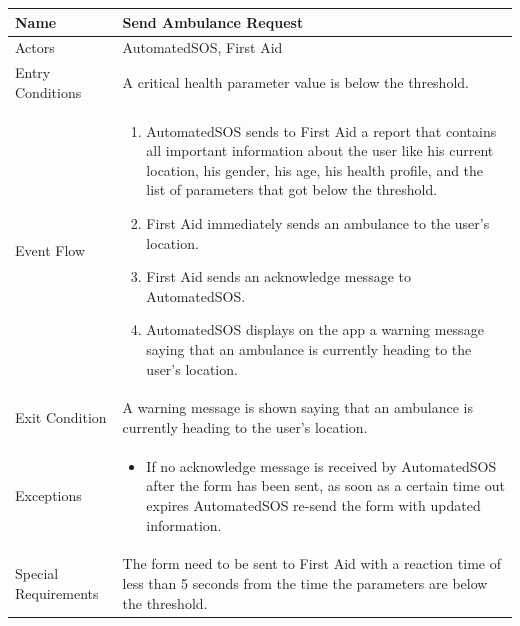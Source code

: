 \begin{enumerate}
\FloatBarrier
\begin{table}[h]
\begin{tabular}{|l|p{}|}
\hline
Name             & Send Ambulance Request \\ \hline
Actors           & AutomatedSOS, First Aid  \\ \hline
Entry Conditions & A critical health parameter value is below the threshold.
\\ \hline
Event Flow       & \begin{enumerate}
            \item AutomatedSOS sends to First Aid a report that contains all important information about the user like his current location, his gender, his age, his health profile, and the list of parameters that got below the threshold.
            \item First Aid immediately sends an ambulance to the user's location.
			\item First Aid sends an acknowledge message to AutomatedSOS.            
            \item AutomatedSOS displays on the app a warning message saying that an ambulance is currently heading to the user's location. 
        \end{enumerate}
\\ \hline
Exit Condition   & A warning message is shown saying that an ambulance is currently heading to the user's location.
\\ \hline
Exceptions       & \begin{itemize}
\item If no acknowledge message is received by AutomatedSOS after the form has been sent, as soon as a certain time out expires AutomatedSOS re-send the form with updated information. 
\end{itemize}
\\ \hline
Special Requirements & The form need to be sent to First Aid with a reaction time of less than 5 seconds from the time the parameters are below the threshold.
\\ \hline 
\end{tabular}
\end{table}
\FloatBarrier


\end{enumerate}

